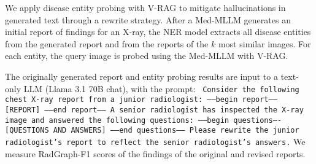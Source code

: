 We apply disease entity probing with V-RAG to mitigate hallucinations in generated text through a rewrite strategy. After a Med-MLLM generates an initial report of findings for an X-ray, the NER model extracts all disease entities from the generated report and from the reports of the $k$ most similar images.  For each entity, the query image is probed using the Med-MLLM with V-RAG.

The originally generated report and entity probing results are input to
a text-only LLM (Llama 3.1 70B chat), with the prompt:
\texttt{
Consider the following chest X-ray report from a junior radiologist:
-----begin report-----
[REPORT]
-----end report-----
A senior radiologist has inspected the X-ray image and answered the following questions:
-----begin questions----
[QUESTIONS AND ANSWERS]
-----end questions-----
Please rewrite the junior radiologist's report to reflect the senior radiologist's answers.}
We measure RadGraph-F1 scores \citep{delbrouck-etal-2024-radgraph}
of the findings of the original and revised reports.

